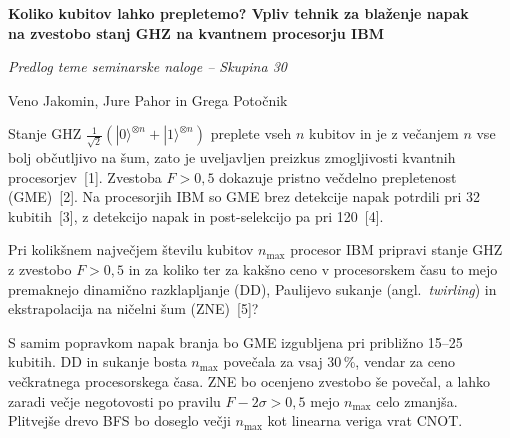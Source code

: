 \documentclass[10pt,a4paper]{article}
\newcommand{\sect}[1]{\par\vspace{4pt}{\normalsize\bfseries #1}\par\vspace{1pt}}
\newcommand{\nmax}{n_{\mathrm{max}}}
\begin{document}
\begin{center}
{\large\bfseries Koliko kubitov lahko prepletemo? Vpliv tehnik za blaženje napak\\
na zvestobo stanj GHZ na kvantnem procesorju IBM}\par\vspace{3pt}
{\itshape Predlog teme seminarske naloge -- Skupina 30}\par
Veno Jakomin, Jure Pahor in Grega Potočnik
\end{center}

\sect{Ozadje}
Stanje GHZ $\frac{1}{\sqrt{2}}(|0\rangle^{\otimes n}+|1\rangle^{\otimes n})$ preplete vseh $n$ kubitov in je z večanjem $n$ vse bolj občutljivo na šum, zato je uveljavljen preizkus zmogljivosti kvantnih procesorjev~[1].
Zvestoba $F>0{,}5$ dokazuje pristno večdelno prepletenost (GME)~[2].
Na procesorjih IBM so GME brez detekcije napak potrdili pri 32 kubitih~[3], z detekcijo napak in post-selekcijo pa pri 120~[4].

\sect{Raziskovalno vprašanje}
Pri kolikšnem največjem številu kubitov $\nmax$ procesor IBM pripravi stanje GHZ z zvestobo $F>0{,}5$ in za koliko ter za kakšno ceno v procesorskem času to mejo premaknejo dinamično razklapljanje (DD), Paulijevo sukanje (angl.\ \emph{twirling}) in ekstrapolacija na ničelni šum (ZNE)~[5]?

\sect{Pričakovani rezultat (hipoteza)}
S samim popravkom napak branja bo GME izgubljena pri približno 15--25 kubitih.
DD in sukanje bosta $\nmax$ povečala za vsaj 30\,\%, vendar za ceno večkratnega procesorskega časa.
ZNE bo ocenjeno zvestobo še povečal, a lahko zaradi večje negotovosti po pravilu $F-2\sigma>0{,}5$ mejo $\nmax$ celo zmanjša.
Plitvejše drevo BFS bo doseglo večji $\nmax$ kot linearna veriga vrat CNOT.
\end{document}
